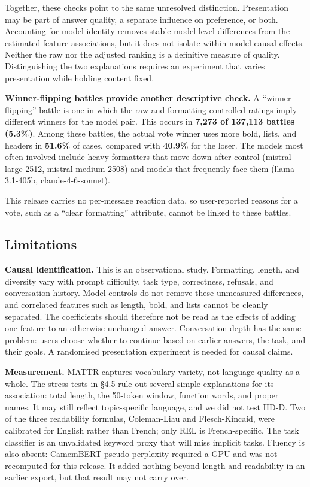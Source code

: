 \documentclass[
]{article}
\begin{document}
Together, these checks point to the same unresolved distinction.
Presentation may be part of answer quality, a separate influence on
preference, or both. Accounting for model identity removes stable
model-level differences from the estimated feature associations, but it
does not isolate within-model causal effects. Neither the raw nor the
adjusted ranking is a definitive measure of quality. Distinguishing the
two explanations requires an experiment that varies presentation while
holding content fixed.

\textbf{Winner-flipping battles provide another descriptive check.} A
“winner-flipping” battle is one in which the raw and
formatting-controlled ratings imply different winners for the model
pair. This occurs in \textbf{7,273 of 137,113 battles (5.3\%)}. Among
these battles, the actual vote winner uses more bold, lists, and headers
in \textbf{51.6\%} of cases, compared with \textbf{40.9\%} for the
loser. The models most often involved include heavy formatters that move
down after control (mistral-large-2512, mistral-medium-2508) and models
that frequently face them (llama-3.1-405b, claude-4-6-sonnet).

This release carries no per-message reaction data, so user-reported
reasons for a vote, such as a ``clear formatting'' attribute, cannot be
linked to these battles.

\subsection{Limitations}\label{limitations}

\textbf{Causal identification.} This is an observational study.
Formatting, length, and diversity vary with prompt difficulty, task
type, correctness, refusals, and conversation history. Model controls do
not remove these unmeasured differences, and correlated features such as
length, bold, and lists cannot be cleanly separated. The coefficients
should therefore not be read as the effects of adding one feature to an
otherwise unchanged answer. Conversation depth has the same problem:
users choose whether to continue based on earlier answers, the task, and
their goals. A randomised presentation experiment is needed for causal
claims.

\textbf{Measurement.} MATTR captures vocabulary variety, not language
quality as a whole. The stress tests in §4.5 rule out several simple
explanations for its association: total length, the 50-token window,
function words, and proper names. It may still reflect topic-specific
language, and we did not test HD-D. Two of the three readability
formulas, Coleman-Liau and Flesch-Kincaid, were calibrated for English
rather than French; only REL is French-specific. The task classifier is
an unvalidated keyword proxy that will miss implicit tasks. Fluency is
also absent: CamemBERT pseudo-perplexity required a GPU and was not
recomputed for this release. It added nothing beyond length and
readability in an earlier export, but that result may not carry over.
\end{document}
